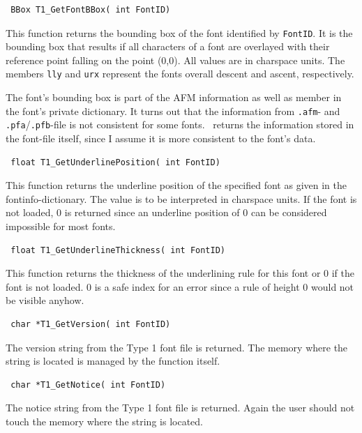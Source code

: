 \precorr
\begin{verbatim}
 BBox T1_GetFontBBox( int FontID)
\end{verbatim}\postcorr
This function returns the bounding box of the font identified by
\verb+FontID+. It is the bounding box that 
results if all characters of a font are overlayed with their reference point
falling on the point (0,0). All values are in charspace units. The members
\verb+lly+ and \verb+urx+ represent the fonts overall descent and ascent,
respectively. 

The font's bounding box is part of the AFM information as well as member in
the font's private dictionary. It turns out that the information from
\verb+.afm+- and \verb+.pfa+/\verb+.pfb+-file is not consistent for some
fonts. \tonelib\ returns the information stored in the font-file itself, since
I assume it is more consistent to the font's data.

\precorr
\begin{verbatim}
 float T1_GetUnderlinePosition( int FontID)
\end{verbatim}\postcorr
This function returns the underline position of the specified font as given in
the fontinfo-dictionary. The value is to be interpreted in charspace
units. If the font is not loaded, 0 is returned since an
underline position of 0 can be considered impossible for most fonts.

\precorr
\begin{verbatim}
 float T1_GetUnderlineThickness( int FontID)
\end{verbatim}\postcorr
This function returns the thickness of the underlining rule for this font or 0
if the font is not loaded. 0 is a safe index for an error since a rule of
height 0 would not be visible anyhow. 

\precorr
\begin{verbatim}
 char *T1_GetVersion( int FontID)
\end{verbatim}\postcorr
The version string from the Type 1 font file is returned. The memory
where the string is located is managed by the function itself.

\precorr
\begin{verbatim}
 char *T1_GetNotice( int FontID)
\end{verbatim}\postcorr
The notice string from the Type 1 font file is returned. Again the
user should not touch the memory where the string is located.

